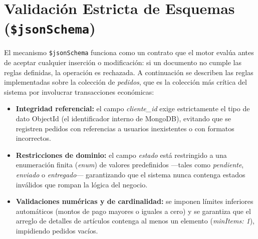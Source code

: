 \documentclass[conference]{IEEEtran}
\begin{document}
\section{Validación Estricta de Esquemas (\texttt{\$jsonSchema})}
El mecanismo \texttt{\$jsonSchema} funciona como un contrato que el motor evalúa antes de aceptar cualquier inserción o modificación: si un documento no cumple las reglas definidas, la operación es rechazada. A continuación se describen las reglas implementadas sobre la colección de \textit{pedidos}, que es la colección más crítica del sistema por involucrar transacciones económicas:
\begin{itemize}
    \item \textbf{Integridad referencial:} el campo \textit{cliente\_id} exige estrictamente el tipo de dato ObjectId (el identificador interno de MongoDB), evitando que se registren pedidos con referencias a usuarios inexistentes o con formatos incorrectos.
    \item \textbf{Restricciones de dominio:} el campo \textit{estado} está restringido a una enumeración finita (\textit{enum}) de valores predefinidos —tales como \textit{pendiente}, \textit{enviado} o \textit{entregado}— garantizando que el sistema nunca contenga estados inválidos que rompan la lógica del negocio.
    \item \textbf{Validaciones numéricas y de cardinalidad:} se imponen límites inferiores automáticos (montos de pago mayores o iguales a cero) y se garantiza que el arreglo de detalles de artículos contenga al menos un elemento (\textit{minItems: 1}), impidiendo pedidos vacíos.
\end{itemize}
\end{document}
